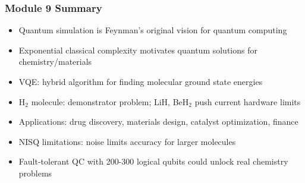 \begin{frame}[fragile]\frametitle{Module 9 Summary}
\begin{itemize}
\item Quantum simulation is Feynman's original vision for quantum computing
\item Exponential classical complexity motivates quantum solutions for chemistry/materials
\item VQE: hybrid algorithm for finding molecular ground state energies
\item H$_2$ molecule: demonstrator problem; LiH, BeH$_2$ push current hardware limits
\item Applications: drug discovery, materials design, catalyst optimization, finance
\item NISQ limitations: noise limits accuracy for larger molecules
\item Fault-tolerant QC with 200-300 logical qubits could unlock real chemistry problems
\end{itemize}
\end{frame}
